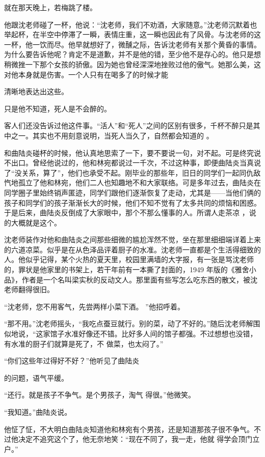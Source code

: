 \documentclass{article}
\begin{document}
就在那天晚上，若梅跳了楼。 

他跟沈老师碰了一杯，他说：“沈老师，我们不劝酒，大家随意。”沈老师沉默着也举起杯，在半空中停滞了一瞬，表情庄重，这一瞬也因此有了风骨。与沈老师的这一杯，他一饮而尽。他早就想好了，微醺之际，告诉沈老师有关那个黄昏的事情。为什么要告诉他呢？肯定不是道歉，并不是他的错，至少他不是存心的。他只是想稍微挫一下那个女孩的骄傲。因为她也曾经深深地挫败过他的傲气。她那么美，这对他本身就是伤害。一个人只有在喝多了的时候才能

\newpage
清晰地表达出这些。 


只是他不知道，死人是不会醉的。 

客人们还没告诉过他这件事。“活人”和“死人”之间的区别有很多，千杯不醉只是其中之一。其实也不用刻意说明，当死人当久了，自然都会知道的
。 

和曲陆炎碰杯的时候，他认真地思索了一下，要不要说一句，对不起。可是终究说不出口。曾经他说过的，他和林宛都说过一千次，不过这种事，即便曲陆炎当真说了“没关系，算了”，他们也承受不起。刚毕业的那些年，旧日的同学们一起同仇敌忾地孤立了他和林宛，他们二人也知趣地不和大家联络。可是多年过去，曲陆炎在同学圈子里始终销声匿迹，同学们跟他们逐渐恢复了走动，尤其是——当他们俩的孩子和同学们的孩子渐渐长大的时候，他们不知不觉有了太多共同的烦恼和困惑。于是后来，曲陆炎反倒成了大家眼中，那个不那么懂事的人。所谓人走茶凉
，说的大概就是这个。 

\newpage

沈老师装作对他和曲陆炎之间那些细微的尴尬浑然不觉，坐在那里细细端详着上来的六道凉菜。似乎是在从色泽品评着厨子的水准。沈老师一直都是个生活得细致的人。他似乎记得，某个火热的夏天里，校园里满墙的大字报，有一张是骂沈老师的，罪状是他家里的书架上，若干年前有一本撕了封面的，1949 年版的《雅舍小品》，作者是一个名叫梁实秋的反动文人。那里面有些写怎么吃东西的散文，被沈
老师翻得很旧。 

“沈老师，您不用客气，先尝两样小菜下酒。
”他招呼着。 

“那不用。”沈老师摇头，“我吃点蚕豆就行。别的菜，动了不好的。”随后沈老师解围似地说，“这家馆子水准好像还不错。比好多人间的馆子都强。不过想想也没错，有水准的厨子们就算是死了，不
做菜，也太闷了。” 

“你们这些年过得好不好？”他听见了曲陆炎

\newpage
的问题，语气平缓。 

“还行。就是孩子不争气。是个男孩子，淘气
得很。”他微笑。 


“我知道。”曲陆炎说。 

他怔了怔，不大明白曲陆炎知道他和林宛有个男孩，还是知道那孩子很不争气。不过他决定不追究这个了，他无奈地笑：“现在不同了，我一走，他就
得学会顶门立户。” 
\end{document}

